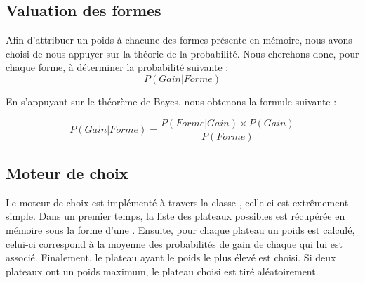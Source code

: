 \subsection{Valuation des formes}
  

Afin d'attribuer un poids à chacune des formes présente en mémoire, nous avons choisi de nous appuyer sur la théorie de la probabilité. Nous cherchons donc, pour chaque forme, à déterminer la probabilité suivante : \[ P(Gain|Forme) \]

En s'appuyant sur le théorème de Bayes, nous obtenons la formule suivante :

\[ P(Gain|Forme) = \frac{P(Forme|Gain) \times P(Gain)}{P(Forme)} \]

\subsection{Moteur de choix}


Le moteur de choix est implémenté à travers la classe , celle-ci est extrêmement simple. Dans un premier temps, la liste des plateaux possibles est récupérée en mémoire sous la forme d'une . Ensuite, pour chaque plateau un poids est calculé, celui-ci correspond à la moyenne des probabilités de gain de chaque  qui lui est associé. Finalement, le plateau ayant le poids le plus élevé est choisi. Si deux plateaux ont un poids maximum, le plateau choisi est tiré aléatoirement.

